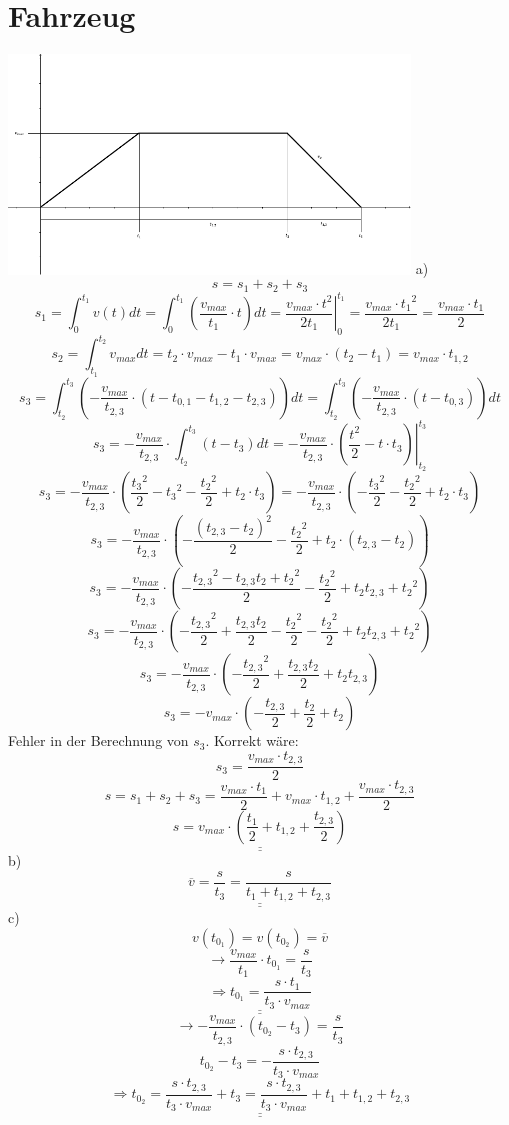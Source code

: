 \section{Fahrzeug}
\includegraphics[width=0.8\textwidth]{bilder/fahrzeug_svg.pdf}
a)
\[ s = s_1 + s_2 + s_3 \]
\[ s_1 = \int_0^{t_1} v(t) dt = \int_0^{t_1} \left( \frac{v_{max}}{t_1} \cdot t \right) dt = \left. \frac{v_{max} \cdot t^2}{2 t_1} \right|_0^{t_1} = \frac{v_{max} \cdot {t_1}^2}{2 t_1} = \frac{v_{max} \cdot {t_1}}{2} \]
\[ s_2 = \int_{t_1}^{t_2} v_{max} dt = t_2 \cdot v_{max} - t_1 \cdot v_{max} = v_{max} \cdot (t_2 - t_1) = v_{max} \cdot t_{1,2} \]
\[ s_3 = \int_{t_2}^{t_3} \left(-\frac{v_{max}}{t_{2,3}} \cdot (t - t_{0,1} - t_{1,2} - t_{2,3})\right) dt = \int_{t_2}^{t_3} \left(-\frac{v_{max}}{t_{2,3}} \cdot (t - t_{0,3})\right) dt \]
\[ s_3 = -\frac{v_{max}}{t_{2,3}} \cdot \int_{t_2}^{t_3} \left(t - t_3\right) dt = -\frac{v_{max}}{t_{2,3}} \cdot \left.\left(\frac{t^2}{2} - t \cdot t_3\right)\right|_{t_2}^{t_3} \]
\[ s_3 = -\frac{v_{max}}{t_{2,3}} \cdot \left(\frac{{t_3}^2}{2} - {t_3}^2 - \frac{{t_2}^2}{2} + t_2 \cdot t_3\right) = -\frac{v_{max}}{t_{2,3}} \cdot \left(-\frac{{t_3}^2}{2} - \frac{{t_2}^2}{2} + t_2 \cdot t_3\right) \]
\[ s_3 = -\frac{v_{max}}{t_{2,3}} \cdot \left(-\frac{(t_{2,3} - t_2)^2}{2} - \frac{{t_2}^2}{2} + t_2 \cdot (t_{2,3} - t_2)\right) \]
\[ s_3 = -\frac{v_{max}}{t_{2,3}} \cdot \left(-\frac{{t_{2,3}}^2 - t_{2,3} t_2 + {t_2}^2}{2} - \frac{{t_2}^2}{2} + t_2 t_{2,3} + {t_2}^2\right) \]
\[ s_3 = -\frac{v_{max}}{t_{2,3}} \cdot \left(-\frac{{t_{2,3}}^2}{2} + \frac{t_{2,3} t_2}{2} - \frac{{t_2}^2}{2} - \frac{{t_2}^2}{2} + t_2 t_{2,3} + {t_2}^2\right) \]
\[ s_3 = -\frac{v_{max}}{t_{2,3}} \cdot \left(-\frac{{t_{2,3}}^2}{2} + \frac{t_{2,3} t_2}{2} + t_2 t_{2,3}\right) \]
\[ s_3 = -v_{max} \cdot \left(-\frac{{t_{2,3}}}{2} + \frac{t_2}{2} + t_2\right) \]
Fehler in der Berechnung von $s_3$. Korrekt wäre: 
\[ s_3 = \frac{v_{max} \cdot t_{2,3}}{2} \]
\[ s = s_1 + s_2 + s_3 = \frac{v_{max} \cdot {t_1}}{2} + v_{max} \cdot t_{1,2} + \frac{v_{max} \cdot t_{2,3}}{2} \]
\[ \underline{\underline{s = v_{max} \cdot \left(\frac{{t_1}}{2} + t_{1,2} + \frac{t_{2,3}}{2}\right)}} \]
b)
\[ \underline{\underline{\overline{v} = \frac{s}{t_3} = \frac{s}{t_{1} + t_{1,2} + t_{2,3}}}} \]
c)
\[ v(t_{0_1}) = v(t_{0_2}) = \overline{v} \]
\[ \rightarrow \frac{v_{max}}{t_1} \cdot t_{0_1} = \frac{s}{t_3} \]
\[ \underline{\underline{\Rightarrow t_{0_1} = \frac{s \cdot t_1}{t_3 \cdot v_{max}}}} \]
\[ \rightarrow -\frac{v_{max}}{t_{2,3}} \cdot (t_{0_2} - t_3) = \frac{s}{t_3} \]
\[ t_{0_2} - t_3 = -\frac{s \cdot t_{2,3}}{t_3 \cdot v_{max}} \]
\[ \underline{\underline{\Rightarrow t_{0_2} = \frac{s \cdot t_{2,3}}{t_3 \cdot v_{max}} + t_3 = \frac{s \cdot t_{2,3}}{t_3 \cdot v_{max}} + t_1 + t_{1,2} + t_{2,3}}} \]
